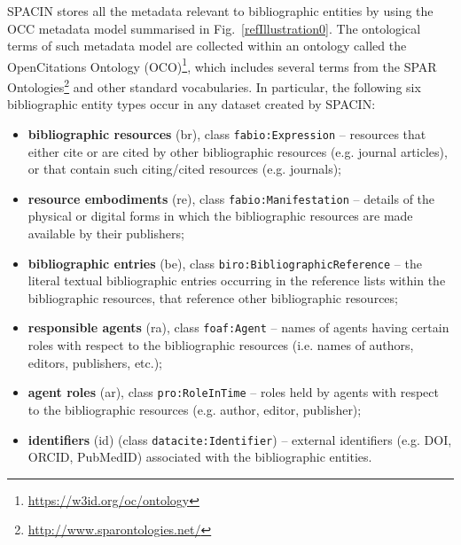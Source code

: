 \documentclass[runningheads,a4paper]{llncs}
\begin{document}
SPACIN stores all the metadata relevant to bibliographic entities by using the OCC metadata model  \cite{__RefNumPara__14748_1591320820} summarised in Fig.~\ref{refIllustration0}. The ontological terms of such metadata model are collected within an ontology called the OpenCitations Ontology (OCO)\footnote{\url{https://w3id.org/oc/ontology}}, which includes several terms from the SPAR Ontologies\footnote{\url{http://www.sparontologies.net/}} \cite{__RefNumPara__17_1852566440} and other standard vocabularies. In particular, the following six bibliographic entity types occur in any dataset created by SPACIN:
\begin{itemize}
\item {\bf bibliographic resources} (br), class \Verb+fabio:Expression+ -- resources that either cite or are cited by other bibliographic resources (e.g. journal articles), or that contain such citing/cited resources (e.g. journals);
\item {\bf resource embodiments} (re), class \Verb+fabio:Manifestation+ -- details of the physical or digital forms in which the bibliographic resources are made available by their publishers;
\item {\bf bibliographic entries} (be), class \Verb+biro:BibliographicReference+ -- the literal textual bibliographic entries occurring in the reference lists within the bibliographic resources, that reference other bibliographic resources;
\item {\bf responsible agents} (ra), class \Verb+foaf:Agent+ -- names of agents having certain roles with respect to the bibliographic resources (i.e. names of authors, editors, publishers, etc.);
\item {\bf agent roles} (ar), class \Verb+pro:RoleInTime+ -- roles held by agents with respect to the bibliographic resources (e.g. author, editor, publisher);
\item {\bf identifiers} (id) (class \Verb+datacite:Identifier+) -- external identifiers (e.g. DOI, ORCID, PubMedID) associated with the bibliographic entities.
\end{itemize}
\end{document}
